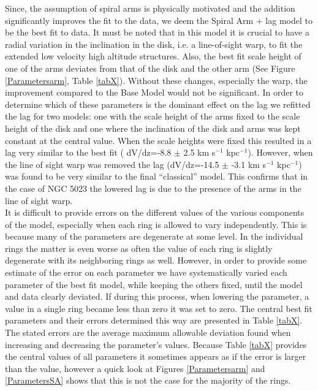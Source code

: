 \documentclass[useAMS,usenatbib]{mn2e}
\begin{document}
\indent Since, the assumption of spiral arms is physically motivated and the addition significantly improves the fit to the data, we deem the Spiral Arm $+$ lag model to be the best fit to data. It must be noted that in this model it is crucial to have a radial variation in the inclination in the disk, i.e. a line-of-sight warp, to fit the extended low velocity high altitude structures. Also, the best fit scale height of one of the arms  deviates from that of the disk and the other arm (See Figure \ref{Parametersarm}, Table \ref{tabX}). Without these changes, especially  the warp, the improvement compared to the Base Model would not be significant. In order to determine which of these parameters is the dominant effect on the lag we refitted the lag for two models: one with the scale height of the arms fixed to the scale height of the disk and one where the inclination of the disk and arms was kept constant at the central value. When the scale heights were fixed this resulted in a lag very similar to the best fit ( dV/dz=-8.8 $\pm$ 2.5 km s$^{-1}$ kpc$^{-1}$). However, when the line of sight warp was removed  the lag (dV/dz=-14.5 $\pm$ -3.1 km s$^{-1}$ kpc$^{-1}$) was found to be  very similar to the final ``classical'' model. This confirms that in the case of NGC 5023 the lowered lag is due to the presence of the arms in the line of sight warp.  \\
\indent It is difficult to provide errors on the different values of the various components of the model, especially when each ring is allowed to vary independently.  This is because many of the parameters are degenerate at some level. In the individual rings the matter is even worse as often the value of each ring is slightly degenerate with its neighboring rings as well. However, in order to provide some estimate of the error on each parameter we have systematically varied each parameter of the best fit model, while keeping the others fixed, until the model and data clearly deviated. If during this process, when lowering the parameter, a value in a single ring became less than zero it was set to zero. The central best fit parameters and their errors determined this way are presented in Table \ref{tabX}. The stated errors are the average maximum allowable deviation found when increasing and decreasing the parameter's values. Because Table \ref{tabX} provides the central values of all parameters it sometimes appears as if the error is larger than the value, however a quick look at Figures \ref{Parametersarm} and \ref{ParametersSA} shows that this is not the case for the majority of the rings.\\
\end{document}
